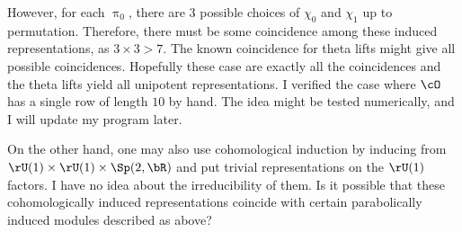 \documentclass[12pt,a4paper]{amsart}
\numberwithin{equation}{section}
\theoremstyle{remark}
\begin{document}
{\begin{enumerate}
        However, for each $\uppi_{0}$, there are $3$ possible choices of
        $\chi_{0}$ and $\chi_{1}$ up to permutation.
        Therefore, there must be some {\color{red} coincidence} among these induced
        representations, as $3\times 3 >7$.
        The known coincidence for theta lifts might give all possible coincidences.
        Hopefully these case are exactly all the coincidences and the
        theta lifts yield all unipotent representations.
        I {\color{red} verified} the case where $\cO$ has a single row of length $10$
        by hand.
        The idea might be tested numerically, and I will update my program later.

        On the other hand, one may also use cohomological induction by inducing from
        $\rU(1)\times \rU(1)\times \Sp(2,\bR)$ and put trivial representations
        on the $\rU(1)$ factors. I have no idea about the
        {\color{red} irreducibility} of them. Is it possible that these
        cohomologically induced representations {\color{red} coincide} with
        certain parabolically induced modules described as above?
\end{enumerate}
}


\printindex
\end{document}
